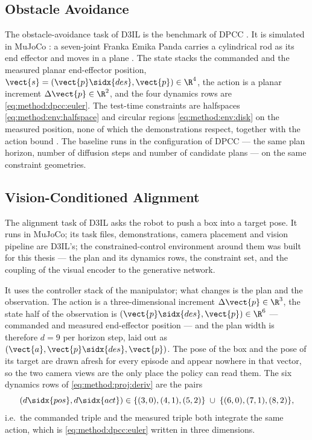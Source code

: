 \subsection{Obstacle Avoidance}\label{sec:method:env:avoiding}

The obstacle-avoidance task of D3IL \parencite{jia2024towards} is the benchmark of \ac{DPCC}
\parencite[Sec.~6.1]{romer2025diffusion}. It is simulated in MuJoCo
\parencite{todorov2012mujoco}: a seven-joint Franka Emika Panda carries a cylindrical rod as its end
effector and moves in a plane \parencite[Sec.~3.3]{jia2024towards}. The state stacks the commanded and the measured planar
end-effector position, $\vect{s} = (\vect{p}\sidx{des},\vect{p})\in\R^{4}$, the action is a planar
increment $\Delta\vect{p}\in\R^{2}$, and the four dynamics rows are \eqref{eq:method:dpcc:euler}. The
test-time constraints are halfspaces \eqref{eq:method:env:halfspace} and circular regions
\eqref{eq:method:env:disk} on the measured position, none of which the demonstrations respect, together
with the action bound \parencite[Sec.~6.1]{romer2025diffusion}. The baseline runs in the configuration of \ac{DPCC} --- the
same plan horizon, number of diffusion steps and number of candidate plans --- on the
same constraint geometries.

\subsection{Vision-Conditioned Alignment}\label{sec:method:env:aligning}

The alignment task of D3IL \parencite{jia2024towards} asks the robot to push a box into a target
pose. It runs in MuJoCo; its task files, demonstrations, camera placement and vision pipeline are
D3IL's; the constrained-control environment
around them was built for this thesis --- the plan and its dynamics rows, the constraint set, and the
coupling of the visual encoder to the generative network.

It uses the controller stack of the manipulator; what changes is the plan and the observation. The action is a three-dimensional increment $\Delta\vect{p}\in\R^{3}$, the state
half of the observation is $(\vect{p}\sidx{des},\vect{p})\in\R^{6}$ --- commanded and measured
end-effector position --- and the plan width is therefore $d = 9$ per horizon step, laid out as
$(\vect{a},\vect{p}\sidx{des},\vect{p})$. The pose of the box and the pose of its target are drawn
afresh for every episode and appear nowhere in that vector, so the two camera views are the only
place the policy can read them.
 The six dynamics rows of
\eqref{eq:method:proj:deriv} are the pairs
\begin{equation}\label{eq:method:dep:varows}
  \left(d\sidx{pos},d\sidx{act}\right) \in
  \{(3,0),(4,1),(5,2)\}\;\cup\;\{(6,0),(7,1),(8,2)\},
\end{equation}
i.e.\ the commanded triple and the measured triple both integrate the same action, which is
\eqref{eq:method:dpcc:euler} written in three dimensions.

